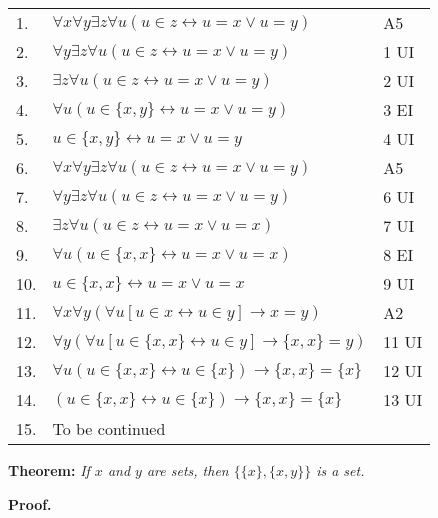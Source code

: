 \documentclass[12pt, a4paper]{article}
\begin{document}
\begin{table}[h!]
    \begin{center}
        \begin{tabular}{l l l}
        \hline
        1. & $\forall x\forall y\exists z\forall u(u\in z\leftrightarrow u=x\vee u=y)$ & A5\\
        2. & $\forall y\exists z\forall u(u\in z\leftrightarrow u=x\vee u=y)$ & 1 UI\\
        3. & $\exists z\forall u(u\in z\leftrightarrow u=x\vee u=y)$ & 2 UI\\
        4. & $\forall u(u\in\{x,y\}\leftrightarrow u=x\vee u=y)$ & 3 EI\\
        5. & $u\in\{x,y\}\leftrightarrow u=x\vee u=y$ & 4 UI\\
        6. & $\forall x\forall y\exists z\forall u(u\in z\leftrightarrow u=x\vee u=y)$ & A5\\
        7. & $\forall y\exists z\forall u(u\in z\leftrightarrow u=x\vee u=y)$ & 6 UI\\
        8. & $\exists z\forall u(u\in z\leftrightarrow u=x\vee u=x)$ & 7 UI\\
        9. & $\forall u(u\in \{x,x\}\leftrightarrow u=x\vee u=x)$ & 8 EI\\
        10.& $u\in\{x,x\}\leftrightarrow u=x\vee u=x$ & 9 UI\\
        11.& $\forall x\forall y(\forall u[u\in x\leftrightarrow u\in y]\rightarrow x=y)$ &       A2\\
        12.& $\forall y(\forall u[u\in\{x,x\}\leftrightarrow u\in y]\rightarrow \{x,x\}=y)$ &      11 UI\\
        13.& $\forall u(u\in\{x,x\}\leftrightarrow u\in\{x\})\rightarrow\{x,x\}=\{x\}$ & 12       UI\\
        14.& $(u\in\{x,x\}\leftrightarrow u\in\{x\})\rightarrow\{x,x\}=\{x\}$ & 13 UI\\
        15.& To be continued &\\
         
        
        \hline
        \end{tabular}
    \end{center}
\end{table}

\newpage

\noindent\textbf{Theorem: }\textit{If $x$ and $y$ are sets, then $\{\{x\},\{x,y\}\}$ is a set.}

\vspace{4mm}

\noindent\textbf{Proof.}
\end{document}
